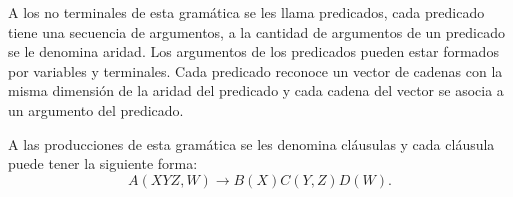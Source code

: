 \documentclass[12pt]{article}
\begin{document}
A los no terminales de esta gramática se les llama predicados, cada predicado tiene una secuencia de argumentos, a la cantidad 
de argumentos de un predicado se le denomina aridad. Los argumentos de los predicados pueden estar formados por variables y terminales.
Cada predicado reconoce un vector de cadenas con la misma dimensión de la aridad del predicado y cada cadena del vector
se asocia a un argumento del predicado.

A las producciones de esta gramática se les denomina cláusulas y cada cláusula puede tener la siguiente forma:
$$A(XYZ,W)\to B(X)C(Y,Z)D(W).$$









\end{document}
